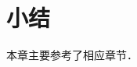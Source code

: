 














\section*{小结}
本章主要参考了\parencite{chen-li-2023-2ed-v1,oneill1983}相应章节．




\printbibliography[heading=subbibliography,title=第\ref{chsm}章参考文献]

\endinput
